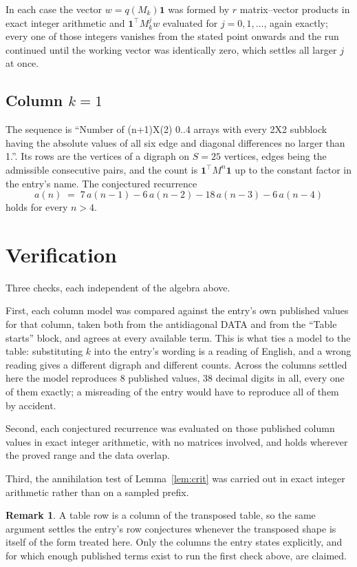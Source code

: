 \documentclass[11pt,a4paper]{article}
\theoremstyle{plain}
\theoremstyle{definition}
\newtheorem{remark}[theorem]{Remark}
\begin{document}
In each case the vector $w=q(M_k)\mathbf{1}$ was formed by $r$ matrix--vector products in
exact integer arithmetic and $\mathbf{1}^{\!\top}M_k^{j}w$ evaluated for $j=0,1,\dots$,
again exactly; every one of those integers vanishes from the stated point onwards and the run
continued until the working vector was identically zero, which settles all larger $j$ at once.

\subsection*{Column $k=1$}
The sequence is ``Number of (n+1)X(2) 0..4 arrays with every 2X2 subblock having the absolute values of all six edge and diagonal differences no larger than 1.''. Its rows are the vertices of a digraph on
$S=25$ vertices, edges being the admissible consecutive pairs, and the count is
$\mathbf{1}^{\!\top}M^{n}\mathbf{1}$ up to the constant factor in the entry's name.
The conjectured recurrence
\[
a(n)\;=\;7\,a(n-1) - 6\,a(n-2) - 18\,a(n-3) - 6\,a(n-4)
\]
holds for every $n>4$.

\section{Verification}

Three checks, each independent of the algebra above.

First, each column model was compared against the entry's own published values for that
column, taken both from the antidiagonal DATA and from the ``Table starts'' block, and agrees
at every available term. This is what ties a model to the table: substituting $k$ into the
entry's wording is a reading of English, and a wrong reading gives a different digraph and
different counts. Across the columns settled here the model reproduces $8$ published
values, $38$ decimal digits in all, every one of them exactly; a misreading of the entry
would have to reproduce all of them by accident.

Second, each conjectured recurrence was evaluated on those published column values in exact
integer arithmetic, with no matrices involved, and holds wherever the proved range and the
data overlap.

Third, the annihilation test of Lemma~\ref{lem:crit} was carried out in exact integer
arithmetic rather than on a sampled prefix.

\begin{remark}
A table row is a column of the transposed table, so the same argument settles the entry's row
conjectures whenever the transposed shape is itself of the form treated here. Only the columns
the entry states explicitly, and for which enough published terms exist to run the first check
above, are claimed.
\end{remark}
\end{document}
